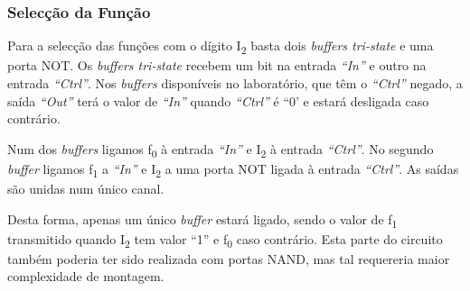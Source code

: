 \documentclass[a4paper,12pt]{article}
\begin{document}
\subsubsection{Selecção da Função}
Para a selecção das funções com o dígito I\textsubscript{2} basta dois {\it buffers tri-state} e uma porta NOT. Os {\it buffers tri-state} recebem um bit na entrada {\it ``In''} e outro na entrada {\it ``Ctrl''}. Nos {\it buffers} disponíveis no laboratório, que têm o {\it ``Ctrl''} negado, a saída {\it ``Out''} terá o valor de {\it ``In''} quando {\it ``Ctrl''} é ``0' e estará desligada caso contrário.
\par
Num dos {\it buffers} ligamos f\textsubscript{0} à entrada {\it ``In''} e I\textsubscript{2} à entrada {\it ``Ctrl''}. No segundo {\it buffer} ligamos f\textsubscript{1} a {\it ``In''} e I\textsubscript{2} a uma porta NOT ligada à entrada {\it ``Ctrl''}. 
As saídas são unidas num único canal. 
\par
Desta forma, apenas um único {\it buffer} estará ligado, sendo o valor de f\textsubscript{1} transmitido quando I\textsubscript{2} tem valor ``1'' e f\textsubscript{0} caso contrário. Esta parte do circuito também poderia ter sido realizada com portas NAND, mas tal requereria maior complexidade de montagem.
\par
\end{document}
